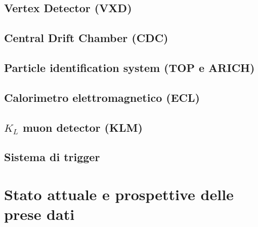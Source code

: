 \begin{comment}
Il rivelatore Belle II è uno spettrometro di particelle general-purpose, ottimizzato nelle misure di precisione dei mesoni B e dei loro prodotti di decadimento. Rispetto al suo predecessore Belle, deve riuscire a mantenere buone performance, pur avendo un minore boost nel centro di masse e nonostante sia sottoposto a maggiori livelli di background e quindi di radiazione, che sono la principale causa di una prematura degradazione delle prestazioni e della vita media del rivelatore stesso.

Belle II consiste in una serie di sottorivelatori annidiati, che circondano il PI dei due fasci, posti intorno alla beam pipe di berillio di 1cm di raggio.

\end{comment}

\subsection{Vertex Detector (VXD)}

\subsection{Central Drift Chamber (CDC)}

\subsection{Particle identification system (TOP e ARICH)}

\subsection{Calorimetro elettromagnetico (ECL)}

\subsection{$K_{L}$ muon detector (KLM)}

\subsection{Sistema di trigger}


\section{Stato attuale e prospettive delle prese dati}



